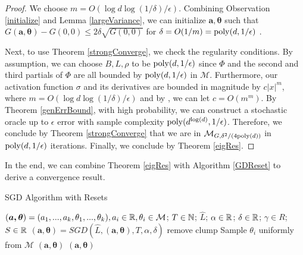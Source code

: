 \begin{proof}
We choose $m = O(\log d \log (1/\delta)/\epsilon)$. Combining Observation \ref{initialize} and Lemma \ref{largeVariance}, we can initialize $\boldsymbol{a,\theta}$ such that $G(\boldsymbol{a,\theta}) - G(0,0) \leq 2\delta \sqrt{G(0,0)}$ for $\delta = O(1/m) = \mathrm{poly}(d,1/\epsilon)$ .

Next, to use Theorem \ref{strongConverge}, we check the regularity conditions. By assumption, we can choose $B, L, \rho$ to be $\mathrm{poly}(d,1/\epsilon)$ since $\Phi$ and the second and third partials of $\Phi$ are all bounded by $\mathrm{poly}(d,1/\epsilon)$ in $\mathcal{M}$. Furthermore, our activation function $\sigma$ and its derivatives are bounded in magnitude by $c|x|^{m}$, where $m = O(\log d \log (1/\delta)/\epsilon)$ and by \cite{Hermite}, we can let $c = O(m^m)$. By Theorem \ref{genErrBound}, with high probability, we can construct a stochastic oracle up to $\epsilon$ error with sample complexity $\mathrm{poly}(d^{\log(d)},1/\epsilon)$. Therefore, we conclude by Theorem \ref{strongConverge} that we are in $\mathcal{M}_{G,\delta^2/(4\mathrm{poly}(d))}$ in $\mathrm{poly}(d,1/\epsilon)$ iterations. Finally, we conclude by Theorem \ref{eigRes}.
\end{proof}











 In the end, we can combine Theorem \ref{eigRes} with Algorithm \ref{GDReset} to derive a convergence result.
 
 \begin{algorithm}[tb]
 \caption{SGD Algorithm with Resets}
   \label{GDReset}
\begin{algorithmic}
  $(\boldsymbol{a,\theta}) = (a_1,...,a_k,\theta_1,...,\theta_k), a_i
  \in{\mathbb{R}}, \theta_i\in\mathcal{M}$;
  $T\in {\mathbb{N}}$; $\widehat{L}$; $\alpha\in {\mathbb{R}}$; $\delta \in {\mathbb{R}}$;
  $\gamma \in R$; $S \in {\mathbb{R}}$ \vspace{0.1in} 
  \STATE $(\boldsymbol{a},\boldsymbol{\theta}) = SGD \left(\widehat{L}, (\boldsymbol{a},\boldsymbol{\theta}),T, \alpha,\delta \right)$
    \STATE remove clump
    \REPEAT \STATE Sample $\theta_i$
  uniformly from $\mathcal{M}$
    \ELSE {} $(\boldsymbol{a}, \boldsymbol{\theta}) $
      \ENDIF
    \ENDFOR
    $(\boldsymbol{a}, \boldsymbol{\theta}) $
   \end{algorithmic}
\end{algorithm}

